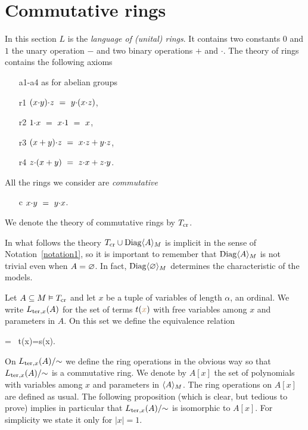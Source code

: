 \documentclass[creche.tex]{subfiles}
\begin{document}
\section{Commutative rings}
\label{anelli}

In this section $L$ is the \emph{language of (unital) rings}. It contains two constants $0$ and $1$ the unary operation $-$ and two binary operations $+$ and $\cdot$. The theory of rings contains the following axioms

\begin{itemize}
\item[a1-a4] as for abelian groups
\item[r1] $(x\mdot y)\mdot z\  =\ y\mdot(x\mdot z)$,
\item[r2] $1\mdot x\ =\ x\mdot 1\ =\ x$,
\item[r3] $(x+y)\mdot z\ =\ x\mdot z + y\mdot z$,
\item[r4] $z\mdot (x+y)\ =\ z\mdot x + z\mdot y$.
\end{itemize}

All the rings we consider are \emph{commutative\/} 

\begin{itemize}
\item[c] $x\mdot y\ =\ y\mdot x$.
\end{itemize}
 
We denote the theory of commutative rings by \emph{$T_{\rm cr}$}.

In what follows the theory $T_{\rm cr}\cup\Diag\<A\>_M$ is implicit in the sense of Notation~\ref{notation1}, so it is important to remember that $\Diag\<A\>_M$ is not trivial even when $A=\0$. In fact, $\Diag\<\0\>_M$ determines the characteristic of the models.

Let  $A\subseteq M\models T_{\rm cr}$ and let $x$ be a tuple of variables of length $\alpha$, an ordinal. We write $L_{{\rm ter},x}(A)$ for the set of terms $t({\mr x})$ with free variables among $x$ and parameters in $A$. On this set we define the equivalence relation

%
{=}%
{\proves \ t({\mr x})=s({\mr x}).}

On $L_{{\rm ter},x}(A)/\mathord{\sim}$ we define the ring operations in the obvious way so that $L_{{\rm ter},x}(A)/\mathord{\sim}$ is a commutative ring. We denote by $A[x]$ the set of polynomials with variables among $x$ and parameters in $\<A\>_M$. The ring operations on $A[x]$ are defined as usual. The following proposition (which is clear, but tedious to prove) implies in particular that $L_{{\rm ter},x}(A)/\mathord{\sim}$ is isomorphic to $A[x]$. For simplicity we state it only for $|x|=1$.
\end{document}
